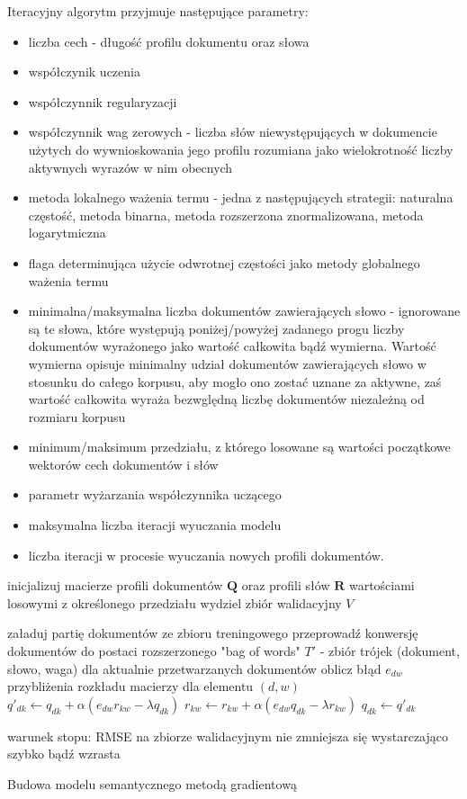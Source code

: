 \documentclass{pracamgr}
\begin{document}
Iteracyjny algorytm przyjmuje następujące parametry:
\begin{itemize}
    \item liczba cech - długość profilu dokumentu oraz słowa
    \item współczynik uczenia
    \item współczynnik regularyzacji
    \item współczynnik wag zerowych - liczba słów niewystępujących w dokumencie użytych do wywnioskowania jego profilu rozumiana jako wielokrotność liczby aktywnych wyrazów w nim obecnych 
    \item metoda lokalnego ważenia termu - jedna z następujących strategii: naturalna częstość, metoda binarna, metoda rozszerzona znormalizowana, metoda logarytmiczna
    \item flaga determinująca użycie odwrotnej częstości jako metody globalnego ważenia termu
    \item minimalna/maksymalna liczba dokumentów zawierających słowo - ignorowane są te słowa, które występują poniżej/powyżej zadanego progu liczby dokumentów wyrażonego jako wartość całkowita bądź wymierna. Wartość wymierna opisuje minimalny udział dokumentów zawierających słowo w stosunku do całego korpusu, aby mogło ono zostać uznane za aktywne, zaś wartość całkowita wyraża bezwględną liczbę dokumentów niezależną od rozmiaru korpusu
    \item minimum/maksimum przedziału, z którego losowane są wartości początkowe wektorów cech dokumentów i słów
    \item parametr wyżarzania współczynnika uczącego
    \item maksymalna liczba iteracji wyuczania modelu
    \item liczba iteracji w procesie wyuczania nowych profili dokumentów.
\end{itemize}

\begin{algorithm}[H]
inicjalizuj macierze profili dokumentów $\mathbf{Q}$ oraz profili słów $\mathbf{R}$ wartościami losowymi z określonego przedziału\;
wydziel zbiór walidacyjny $V$\;
 {
    załaduj partię dokumentów ze zbioru treningowego\;
    przeprowadź konwersję dokumentów do postaci rozszerzonego "bag of words"\;
    $T'$ - zbiór trójek (dokument, słowo, waga) dla aktualnie przetwarzanych dokumentów \;
     {
        oblicz błąd $e_{dw}$ przybliżenia rozkładu macierzy dla elementu $(d, w)$\;
         { 
            $q'_{dk} \gets q_{dk} + \alpha (e_{dw} r_{kw} - \lambda q_{dk})$\;
            $r_{kw} \gets r_{kw} + \alpha (e_{dw} q_{dk} - \lambda r_{kw})$\;
            $q_{dk} \gets q'_{dk}$\;
        }
    }
    
    warunek stopu: RMSE na zbiorze walidacyjnym nie zmniejsza się wystarczająco szybko bądź wzrasta
}
\caption{Budowa modelu semantycznego metodą gradientową}
\end{algorithm}
\end{document}
